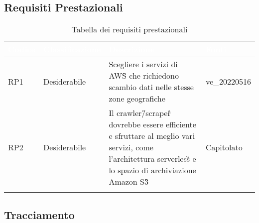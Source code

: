 \subsection{Requisiti Prestazionali}
{
      \setlength{\freewidth}{\dimexpr\textwidth-10\tabcolsep}
      \renewcommand{\arraystretch}{1.5}
      \centering
      \setlength{\aboverulesep}{0pt}
      \setlength{\belowrulesep}{0pt}
      \begin{longtable}{C{.15\freewidth} C{.2\freewidth} C{.528\freewidth} C{.15\freewidth}}
         \toprule
      \textcolor{white}{\textbf{Codice}}&
      \textcolor{white}{\textbf{Classificazione}}&
      \textcolor{white}{\textbf{Descrizione}}&
      \textcolor{white}{\textbf{Fonti}}\\	
      \toprule
      \endhead
      
      RP1 & Desiderabile & Scegliere i servizi di AWS\G{} che richiedono scambio dati nelle stesse zone geografiche & ve\_20220516 \\
      RP2 & Desiderabile & Il crawler\G/scraper\G{} dovrebbe essere efficiente e sfruttare al meglio vari servizi, come l'architettura serverless\G{} e lo spazio di archiviazione Amazon S3\G{} & Capitolato \\	   
      \bottomrule
      \caption{Tabella dei requisiti prestazionali}
      \end{longtable}
}
\subsection{Tracciamento}
